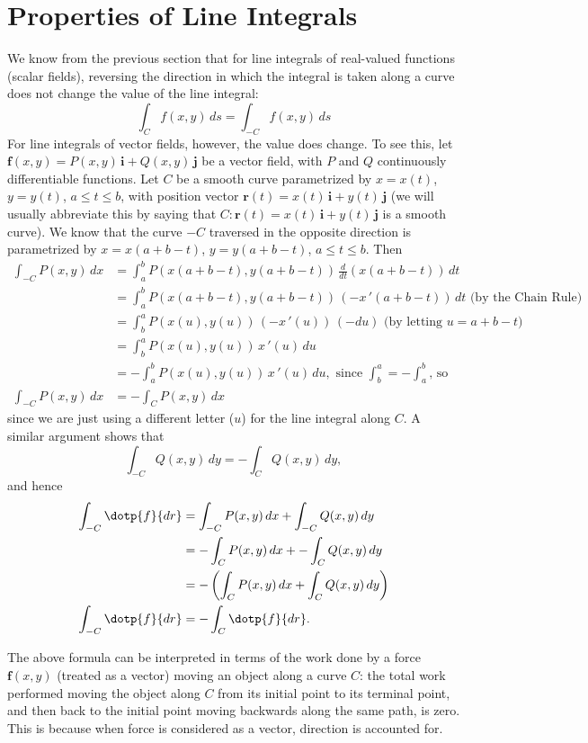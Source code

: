 \section{Properties of Line Integrals}\label{sec:line_int_props}

We know from the previous section that for line integrals of real-valued functions (scalar fields), reversing the direction in which the integral is taken along a curve does not change the value of the line integral:
\[\int_C f(x,y)\,ds = \int_{-C} f(x,y)\,ds\]
For line integrals of vector fields, however, the value does change. To see this, let $\textbf{f}(x,y) =P(x,y)\,\textbf{i} + Q(x,y)\,\textbf{j}$ be a vector field, with $P$ and $Q$ continuously differentiable functions. Let $C$ be a smooth curve parametrized by $x=x(t)$, $y=y(t)$, $a \le t \le b$, with position vector $\textbf{r}(t) = x(t)\,\textbf{i} + y(t)\,\textbf{j}$ (we will usually abbreviate this by saying that $C: \textbf{r}(t) = x(t)\,\textbf{i} + y(t)\,\textbf{j}$ is a smooth curve). We know that the curve $-C$ traversed in the opposite direction is parametrized by $x=x(a+b-t)$, $y=y(a+b-t)$, $a \le t \le b$. Then
\begin{align*}
 \int_{-C} P(x,y)\,dx &= \int_a^b P(x(a+b-t),y(a+b-t))\,\frac{d}{dt}(x(a+b-t))\,dt\\
  &= \int_a^b P(x(a+b-t),y(a+b-t))\,(-x\,'(a+b-t))\,dt\text{ (by the Chain Rule)}\\
  &= \int_b^a P(x(u),y(u))\,(-x\,'(u))\,(-du)\text{ (by letting $u=a+b-t$)}\\
  &= \int_b^a P(x(u),y(u))\,x\,'(u)\,du\\
  &= -\int_a^b P(x(u),y(u))\,x\,'(u)\,du,\text{ since $\int_b^a = -\int_a^b$, so}\\
  \int_{-C} P(x,y)\,dx &= -\int_C P(x,y)\,dx
\end{align*}
since we are just using a different letter ($u$) for the line integral along $C$. A similar argument shows that
\[\int_{-C} Q(x,y)\,dy = -\int_C Q(x,y)\,dy ,\]
and hence
\begin{align}
 \int_{-C} \dotp{f}{dr}
 &= \int_{-C} P(x,y)\,dx + \int_{-C} Q(x,y)\,dy\notag\\
  &= -\int_C P(x,y)\,dx + -\int_C Q(x,y)\,dy\notag\\
  &= -\left( \int_C P(x,y)\,dx + \int_C Q(x,y)\,dy \right)\notag\\
  \int_{-C} \dotp{f}{dr} &= -\int_C \dotp{f}{dr} .
\end{align}

The above formula can be interpreted in terms of the work done by a force $\textbf{f}(x,y)$ (treated as a vector) moving an object along a curve $C$: the total work performed moving the object along $C$ from its initial point to its terminal point, and then back to the initial point moving backwards along the same path, is zero. This is because when force is considered as a vector, direction is accounted for.

